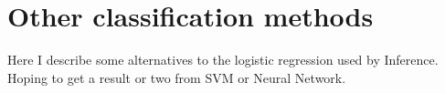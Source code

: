\chapter{Other classification methods}
Here I describe some alternatives to the logistic regression used by Inference. Hoping to get a result or two from SVM or Neural Network.
